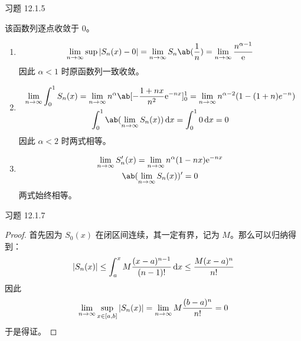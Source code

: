 \begin{problem}
    习题 12.1.5
    \begin{solution}
        该函数列逐点收敛于 $0$。
        \begin{enumerate}
            \item[\textbf{1)}]
            $$
            \lim_{n \to \infty} \sup \abs{S_n(x) - 0} = \lim_{n \to \infty} S_{n}\ab(\frac{1}{n}) = \lim_{n \to \infty} \frac{n^{\alpha - 1}}{\E}
            $$
            因此 $\alpha < 1$ 时原函数列一致收敛。

            \item[\textbf{2)}]
            $$
            \begin{gathered}
                \lim_{n \to \infty} \int_0^1 S_n(x) = \lim_{n \to \infty} n^{\alpha} \ab[-\frac{1 + nx}{n^2} \E^{-nx}]_0^1 = \lim_{n \to \infty} n^{\alpha - 2} (1 - (1 + n) e^{-n}) \\
                \int_0^1 \ab(\lim_{n \to \infty} S_n(x)) \dd{x} = \int_0^1 0 \dd{x} = 0
            \end{gathered}
            $$
            因此 $\alpha < 2$ 时两式相等。

            \item[\textbf{3)}]
            $$
            \begin{gathered}
                \lim_{n \to \infty} S'_n(x) = \lim_{n \to \infty} n^{\alpha} (1 - nx) \E^{-nx} \\
                \ab(\lim_{n \to \infty} S_n(x))' = 0
            \end{gathered}
            $$
            两式始终相等。
        \end{enumerate}
    \end{solution}
\end{problem}

\begin{problem}
    习题 12.1.7
    \begin{proof}
        首先因为 $S_0(x)$ 在闭区间连续，其一定有界，记为 $M$。那么可以归纳得到：
        $$
        \abs{S_n(x)} \le \int_a^x M \frac{(x - a)^{n - 1}}{(n - 1)!} \dd{x} \le \frac{M (x - a)^{n}}{n!}
        $$
        因此
        $$
        \lim_{n \to \infty} \sup_{x \in [a, b]} \abs{S_n(x)} = \lim_{n \to \infty} M \frac{(b - a)^{n}}{n!} = 0
        $$
        于是得证。
    \end{proof}
\end{problem}

